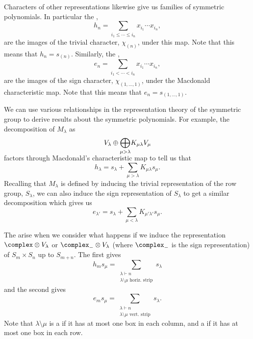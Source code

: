 \documentclass[fleqn]{NotesClass}
\newcommand{\partition}{\vdash}
\begin{document}
    Characters of other representations likewise give us families of symmetric polynomials.
    In particular the ,
    \begin{equation}
        h_n = \sum_{i_1 \le \dotsb \le i_n} x_{i_1} \dotsm x_{i_n},
    \end{equation}
    are the images of the trivial character, \(\chi_{(n)}\), under this map.
    Note that this means that \(h_n = s_{(n)}\).
    Similarly, the ,
    \begin{equation}
        e_n = \sum_{i_1 < \dotsb < i_n} x_{i_1} \dotsm x_{i_n},
    \end{equation}
    are the images of the sign character, \(\chi_{(1, \dotsc, 1)}\), under the Macdonald characteristic map.
    Note that this means that \(e_n = s_{(1, \dotsc, 1)}\).
    
    We can use various relationships in the representation theory of the symmetric group to derive results about the symmetric polynomials.
    For example, the decomposition of \(M_\lambda\) as
    \begin{equation}
        V_\lambda \oplus \vphantom{\bigoplus}\smash{\bigoplus_{\mu > \lambda}} K_{\mu\lambda} V_\mu
    \end{equation}
    factors through Macdonald's characteristic map to tell us that
    \begin{equation}
        h_\lambda = s_\lambda + \sum_{\mu > \lambda} K_{\mu\lambda}s_\mu.
    \end{equation}
    Recalling that \(M_\lambda\) is defined by inducing the trivial representation of the row group, \(S_\lambda\), we can also induce the sign representation of \(S_\lambda\) to get a similar decomposition which gives us
    \begin{equation}
        e_{\lambda'} = s_{\lambda} + \sum_{\mu < \lambda} K_{\mu' \lambda'} s_\mu.
    \end{equation}
    
    The  arise when we consider what happens if we induce the representation \(\complex \otimes V_\lambda\) or \(\complex_{-} \otimes V_\lambda\) (where \(\complex_{-}\) is the sign representation) of \(S_m \times S_n\) up to \(S_{m+n}\).
    The first gives
    \begin{equation}
        h_m s_\mu = \sum_{\substack{\lambda \partition n\\ \lambda \setminus \mu \text{ horiz. strip}}} s_\lambda
    \end{equation}
    and the second gives
    \begin{equation}
        e_m s_\mu =  \sum_{\substack{\lambda \partition n\\ \lambda \setminus \mu \text{ vert. strip}}} s_\lambda.
    \end{equation}
    Note that \(\lambda \setminus \mu\) is a  if it has at most one box in each column, and a  if it has at most one box in each row.
    
\end{document}
